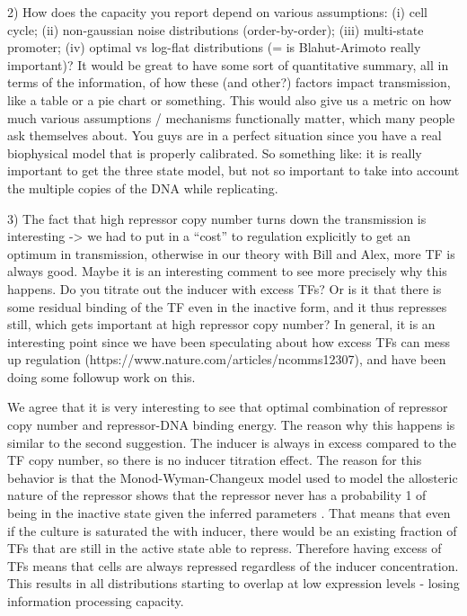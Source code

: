 \begin{tcolorbox}
2) How does the capacity you report depend on various assumptions: (i) cell
cycle; (ii) non-gaussian noise distributions (order-by-order); (iii) multi-state
promoter; (iv) optimal vs log-flat distributions (= is Blahut-Arimoto really
important)? It would be great to have some sort of quantitative summary, all in
terms of the information, of how these (and other?) factors impact transmission,
like a table or a pie chart or something. This would also give us a metric on
how much various assumptions / mechanisms functionally matter, which many people
ask themselves about. You guys are in a perfect situation since you have a real
biophysical model that is properly calibrated. So something like: it is really
important to get the three state model, but not so important to take into
account the multiple copies of the DNA while replicating.
\end{tcolorbox}

\begin{tcolorbox}
3) The fact that high repressor copy number turns down the transmission is
interesting -> we had to put in a “cost” to regulation explicitly to get an
optimum in transmission, otherwise in our theory with Bill and Alex, more TF is
always good. Maybe it is an interesting comment to see more precisely why this
happens. Do you titrate out the inducer with excess TFs? Or is it that there is
some residual binding of the TF even in the inactive form, and it thus represses
still, which gets important at high repressor copy number? In general, it is an
interesting point since we have been speculating about how excess TFs can mess
up regulation (https://www.nature.com/articles/ncomms12307), and have been doing
some followup work on this.
\end{tcolorbox}

We agree that it is very interesting to see that optimal combination of
repressor copy number and repressor-DNA binding energy. The reason why this
happens is similar to the second suggestion. The inducer is always in excess
compared to the TF copy number, so there is no inducer titration effect. The
reason for this behavior is that the Monod-Wyman-Changeux model used to model
the allosteric nature of the repressor shows that the repressor never has a
probability 1 of being in the inactive state given the inferred parameters
\cite{Razo-Mejia2018}. That means that even if the culture is saturated the
with inducer, there would be an existing fraction of TFs that are still in the
active state able to repress. Therefore having excess of TFs means that cells
are always repressed regardless of the inducer concentration. This results in
all distributions starting to overlap at low expression levels - losing
information processing capacity.

